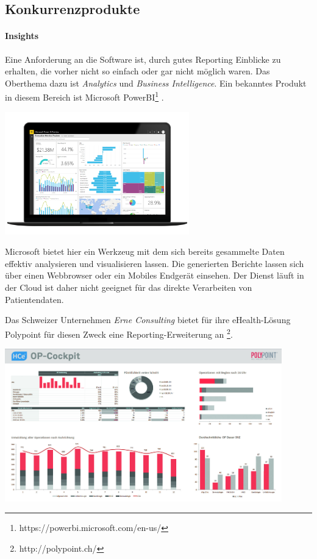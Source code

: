 \documentclass[a4paper]{scrreprt}
\begin{document}
\subsection{Konkurrenzprodukte}
\paragraph{Insights} Eine Anforderung an die Software ist, durch gutes Reporting Einblicke zu erhalten, die vorher nicht so einfach oder gar nicht möglich waren. Das Oberthema dazu ist \textit{Analytics} und \textit{Business Intelligence}. Ein bekanntes Produkt in diesem Bereich ist Microsoft PowerBI\footnote{https://powerbi.microsoft.com/en-us/} .

\includegraphics[width=0.6\textwidth]{img/research_ms-powerbi.png}

Microsoft bietet hier ein Werkzeug mit dem sich bereits gesammelte Daten effektiv analysieren und visualisieren lassen. Die generierten Berichte lassen sich über einen Webbrowser oder ein Mobiles Endgerät einsehen. Der Dienst läuft in der Cloud ist daher nicht geeignet für das direkte Verarbeiten von Patientendaten.

\bigskip

Das Schweizer Unternehmen \textit{Erne Consulting} bietet für ihre eHealth-Lösung Polypoint für diesen Zweck eine Reporting-Erweiterung an \footnote{http://polypoint.ch/}.

\includegraphics[width=0.9\textwidth]{img/research_polypoint_op-cockpit.jpg}
\end{document}
